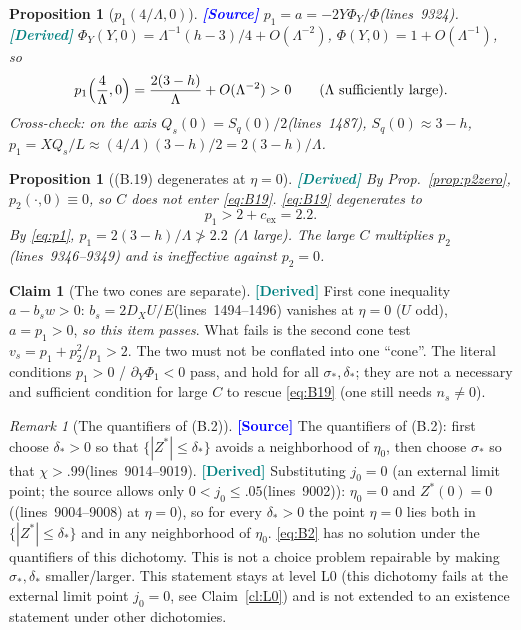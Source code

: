 \documentclass[11pt,a4paper]{article}
\newtheorem{proposition}[theorem]{Proposition}
\theoremstyle{definition}
\newtheorem{claim}[theorem]{Claim}
\theoremstyle{remark}
\newtheorem{remark}[theorem]{Remark}
\newcommand{\lnos}[1]{(lines~#1)}
\newcommand{\ORIG}{\textcolor{blue}{\textbf{[Source]}}}
\newcommand{\DER}{\textcolor{teal}{\textbf{[Derived]}}}
\begin{document}
\begin{proposition}[$p_1(4/\Lambda,0)$]
\label{prop:p1}
\ORIG
$p_1=a=-2Y\Phi_Y/\Phi$\lnos{9324}.
\DER
$\Phi_Y(Y,0)=\Lambda^{-1}(h-3)/4+O(\Lambda^{-2})$,
$\Phi(Y,0)=1+O(\Lambda^{-1})$, so
\begin{equation}
\label{eq:p1}
p_1\Bigl(\frac{4}{\Lambda},0\Bigr)
=\frac{2(3-h)}{\Lambda}+O(\Lambda^{-2})>0
\qquad(\Lambda\text{ sufficiently large}).
\end{equation}
Cross-check: on the axis $Q_s(0)=S_q(0)/2$\lnos{1487}, $S_q(0)\approx 3-h$,
$p_1=XQ_s/L\approx(4/\Lambda)(3-h)/2=2(3-h)/\Lambda$.
\end{proposition}

\begin{proposition}[(B.19) degenerates at $\eta=0$]
\label{prop:B19deg}
\DER
By Prop.~\ref{prop:p2zero}, $p_2(\cdot,0)\equiv 0$, so $C$ does not enter \eqref{eq:B19}.
\eqref{eq:B19} degenerates to
\begin{equation}
\label{eq:B19deg}
p_1>2+c_{\mathrm{ex}}=2.2.
\end{equation}
By \eqref{eq:p1}, $p_1=2(3-h)/\Lambda\not>2.2$ ($\Lambda$ large).
The large $C$ multiplies $p_2$\lnos{9346--9349} and is ineffective against $p_2=0$.
\end{proposition}

\begin{claim}[The two cones are separate]
\label{cl:two-cones}
\DER
First cone inequality $a-b_s w>0$:
$b_s=2D_X U/E$\lnos{1494--1496} vanishes at $\eta=0$ ($U$ odd), $a=p_1>0$,
\emph{so this item passes}.
What fails is the second cone test $v_s=p_1+p_2^2/p_1>2$.
The two must not be conflated into one ``cone''.
The literal conditions $p_1>0$ / $\partial_Y\Phi_1<0$ pass, and hold for all $\sigma_*,\delta_*$;
they are not a necessary and sufficient condition for large $C$ to rescue \eqref{eq:B19}
(one still needs $n_s\neq 0$).
\end{claim}

\begin{remark}[The quantifiers of (B.2)]
\ORIG
The quantifiers of (B.2): first choose $\delta_*>0$ so that $\{|Z^*|\le\delta_*\}$ avoids a
neighborhood of $\eta_0$, then choose $\sigma_*$ so that $\chi>.99$\lnos{9014--9019}.
\DER
Substituting $j_0=0$ (an external limit point; the source allows only $0<j_0\le.05$\lnos{9002}):
$\eta_0=0$ and $Z^*(0)=0$ (\lnos{9004--9008} at $\eta=0$),
so for every $\delta_*>0$ the point $\eta=0$ lies both in $\{|Z^*|\le\delta_*\}$ and in any
neighborhood of $\eta_0$.
\eqref{eq:B2} has no solution under the quantifiers of this dichotomy. This is not a choice problem
repairable by making $\sigma_*,\delta_*$ smaller/larger.
This statement stays at level L0 (this dichotomy fails at the external limit point $j_0=0$,
see Claim~\ref{cl:L0}) and is not extended to an existence statement under other dichotomies.
\end{remark}
\end{document}
